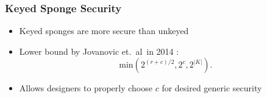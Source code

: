 \begin{frame}
\frametitle{Keyed Sponge Security}
\begin{itemize}
  \item Keyed sponges are more secure than unkeyed \cite{Bertoni2011_SpongeKeyed}
  \item Lower bound by Jovanovic et.~al\ in 2014 \cite{Jovanovic2014_Beyond}:
  \begin{equation*}
  \mathrm{min}(2^{(r+c)/2}, 2^c, 2^{|K|}).
  \end{equation*} 
  \item Allows designers to properly choose $c$ for desired generic security
\end{itemize}
\end{frame}




